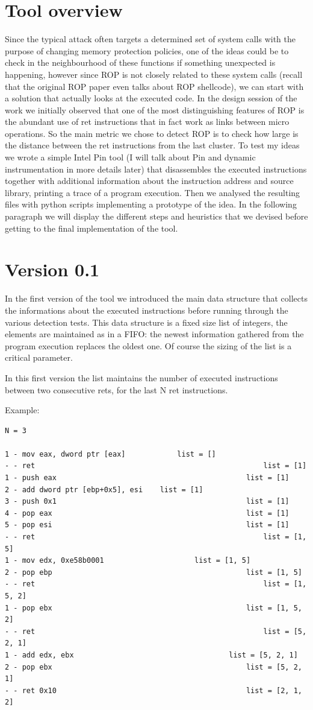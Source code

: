 \documentclass[Lau,binding=0.6cm]{sapthesis}
\begin{document}
\section{Tool overview}

Since the typical attack often targets a determined set of system calls with the purpose of changing memory protection policies, one of the ideas could be to check in the neighbourhood of these functions if something unexpected is happening, however since ROP is not closely related to these system calls (recall that the original ROP paper even talks about ROP shellcode), we can start with a solution that actually looks at the executed code.
In the design session of the work we initially observed that one of the most distinguishing features of ROP is the abundant use of ret instructions that in fact work as links between micro operations. So the main metric we chose to detect ROP is to check how large is the distance between the ret instructions from the last cluster.
To test my ideas we wrote a simple Intel Pin tool (I will talk about Pin and dynamic instrumentation in more details later) that disassembles the executed instructions together with additional information about the instruction address and source library, printing a trace of a program execution. Then we analysed the resulting files with python scripts implementing a prototype of the idea.
In the following paragraph we will display the different steps and heuristics that we devised before getting to the final implementation of the tool.

\section{Version 0.1}

In the first version of the tool we introduced the main data structure that collects the informations about the executed instructions before running through the various detection tests.
This data structure is a fixed size list of integers, the elements are maintained as in a FIFO: the newest information gathered from the program execution replaces the oldest one. Of course the sizing of the list is a critical parameter. 


In this first version the list maintains the number of executed instructions between two consecutive rets, for the last N ret instructions.


Example: 

\begin{lstlisting}
N = 3

1 - mov eax, dword ptr [eax]			list = []
- - ret														list = [1]
1 - push eax											list = [1]
2 - add dword ptr [ebp+0x5], esi	list = [1]
3 - push 0x1											list = [1]
4 - pop eax												list = [1]
5 - pop esi												list = [1]
- - ret														list = [1, 5]
1 - mov edx, 0xe58b0001						list = [1, 5]
2 - pop ebp												list = [1, 5]
- - ret														list = [1, 5, 2]
1 - pop ebx												list = [1, 5, 2]
- - ret														list = [5, 2, 1]
1 - add edx, ebx									list = [5, 2, 1]
2 - pop ebx												list = [5, 2, 1]
- - ret 0x10											list = [2, 1, 2]

\end{lstlisting}
\end{document}
